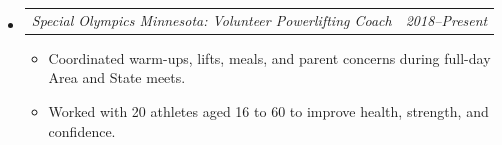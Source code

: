 \documentclass[12pt,letterpaper]{article}
\makeatletter
\newcommand{\headerpair}[2]{
    \begin{tabular*}{\linewidth}{l@{ \extracolsep{\fill} }r} {\large\emph{#1}} & {\large\emph{#2}}
    \end{tabular*}
}
\newcommand{\headerrow}[3]{\headerpair{#2: #1}{#3}}
\newcommand{\YearRange}[2]{#1--#2}
\newcommand{\CPP}{C\nolinebreak[4]\hspace{-.05em}\raisebox{.22ex}{\footnotesize\bf ++}\xspace}
\makeatother
\begin{document}
\begin{itemize}[leftmargin=\parindent]
\begin{itemize}[leftmargin=\parindent]

        \end{itemize}

    \item[]
        \headerrow
            {Volunteer Powerlifting Coach}
            {Special Olympics Minnesota}
            {\YearRange{2018}{Present}}
        \begin{itemize}[leftmargin=\parindent]
            \item Coordinated warm-ups, lifts, meals, and parent concerns during full-day Area and State meets.
            \item Worked with 20 athletes aged 16 to 60 to improve health, strength, and confidence.
        \end{itemize}


\end{itemize}
\end{document}

